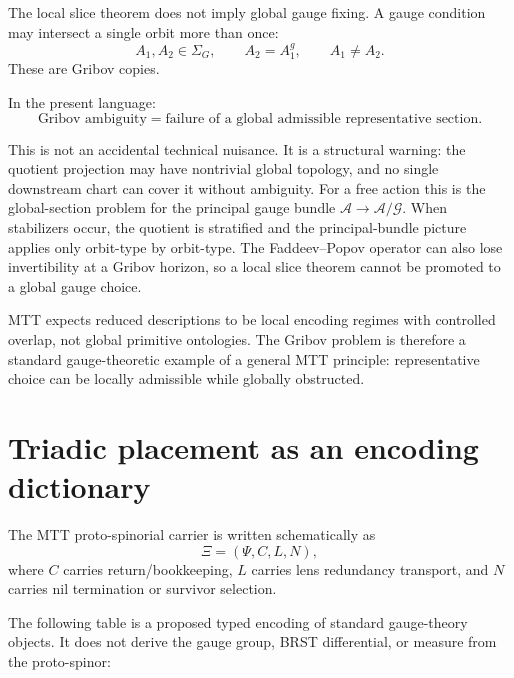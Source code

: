 \documentclass[11pt]{article}
\newcommand{\A}{\mathcal A}
\newcommand{\G}{\mathcal G}
\begin{document}
The local slice theorem does not imply global gauge fixing. A gauge condition may intersect a single orbit more than once:
\[
A_1,A_2\in\Sigma_G,\qquad A_2=A_1^g,\qquad A_1\ne A_2.
\]
These are Gribov copies.

In the present language:
\[
\boxed{
\text{Gribov ambiguity}=
\text{failure of a global admissible representative section}.
}
\]

This is not an accidental technical nuisance. It is a structural warning:
the quotient projection may have nontrivial global topology, and no single
downstream chart can cover it without ambiguity.  For a free action this is
the global-section problem for the principal gauge bundle
\(\A\to\A/\G\).  When stabilizers occur, the quotient is stratified and the
principal-bundle picture applies only orbit-type by orbit-type.  The
Faddeev--Popov operator can also lose invertibility at a Gribov horizon, so a
local slice theorem cannot be promoted to a global gauge choice.

\begin{remark}
MTT expects reduced descriptions to be local encoding regimes with controlled overlap, not global primitive ontologies. The Gribov problem is therefore a standard gauge-theoretic example of a general MTT principle: representative choice can be locally admissible while globally obstructed.
\end{remark}

\section{Triadic placement as an encoding dictionary}

The MTT proto-spinorial carrier is written schematically as
\[
\Xi=(\Psi,C,L,N),
\]
where \(C\) carries return/bookkeeping, \(L\) carries lens redundancy transport, and \(N\) carries nil termination or survivor selection.

The following table is a proposed typed encoding of standard gauge-theory
objects.  It does not derive the gauge group, BRST differential, or measure
from the proto-spinor:
\end{document}
